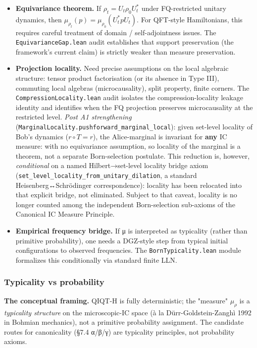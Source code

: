 \documentclass[11pt,a4paper]{article}
\begin{document}
\begin{itemize}
  \item \textbf{Equivariance theorem.} If $\rho_t = U_t \rho_0 U_t^*$ under FQ-restricted unitary dynamics, then $\mu_{\rho_t}(p) = \mu_{\rho_0}(U_t^* p U_t)$. For QFT-style Hamiltonians, this requires careful treatment of domain / self-adjointness issues. The \texttt{EquivarianceGap.lean} audit establishes that support preservation (the framework's current claim) is strictly weaker than measure preservation.
  \item \textbf{Projection locality.} Need precise assumptions on the local algebraic structure: tensor product factorisation (or its absence in Type III), commuting local algebras (microcausality), split property, finite corners. The \texttt{CompressionLocality.lean} audit isolates the compression-locality leakage identity and identifies when the FQ projection preserves microcausality at the restricted level. \emph{Post A1 strengthening} (\texttt{MarginalLocality.pushforward\_marginal\_local}): given set-level locality of Bob's dynamics ($r\circ T = r$), the Alice-marginal is invariant for \textbf{any} IC measure: with no equivariance assumption, so locality of the marginal is a theorem, not a separate Born-selection postulate. This reduction is, however, \emph{conditional} on a named Hilbert→set-level locality bridge axiom (\texttt{set\_level\_locality\_from\_unitary\_dilation}, a standard Heisenberg↔Schrödinger correspondence): locality has been relocated into that explicit bridge, not eliminated. Subject to that caveat, locality is no longer counted among the independent Born-selection sub-axioms of the Canonical IC Measure Principle.
  \item \textbf{Empirical frequency bridge.} If μ is interpreted as typicality (rather than primitive probability), one needs a DGZ-style step from typical initial configurations to observed frequencies. The \texttt{BornTypicality.lean} module formalizes this conditionally via standard finite LLN.
\end{itemize}

\subsubsection{Typicality vs probability}

\textbf{The conceptual framing.} QIQT-H is fully deterministic; the "measure" $\mu_\rho$ is a \emph{typicality structure} on the microscopic-IC space (à la Dürr-Goldstein-Zanghì 1992 in Bohmian mechanics), not a primitive probability assignment. The candidate routes for canonicality (§7.4 α/β/γ) are typicality principles, not probability axioms.
\end{document}
